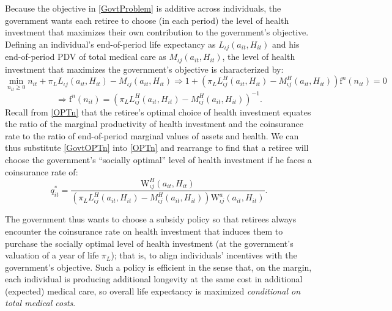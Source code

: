 \documentclass[12pt,pdftex,letterpaper]{article}
\newcommand{\Type}{\iota}
\newcommand{\PostHealth}{H}
\newcommand{\PostValue}{\text{W}}
\newcommand{\Invst}{n}
\newcommand{\Assets}{a}
\newcommand{\Copay}{q}
\newcommand{\Age}{j}
\newcommand{\HealthProdFunc}{\text{f}}
\begin{document}
Because the objective in \eqref{GovtProblem} is additive across individuals, the government wants each retiree to choose (in each period) the level of health investment that maximizes their own contribution to the government's objective.  Defining an individual's end-of-period life expectancy as $L_{\Type \Age}(\Assets_{it},\PostHealth_{it})$ and his end-of-period PDV of total medical care as $M_{\Type \Age}(\Assets_{it},\PostHealth_{it})$, the level of health investment that maximizes the government's objective is characterized by:
\begin{equation*}
\min_{\Invst_{it} \geq 0} \Invst_{it} + \pi_L L_{\Type \Age}(\Assets_{it},\PostHealth_{it}) - M_{\Type \Age}(\Assets_{it},\PostHealth_{it}) \Longrightarrow 1 + \left( \pi_L L^\PostHealth_{\Type \Age}(\Assets_{it},\PostHealth_{it}) - M^\PostHealth_{\Type \Age}(\Assets_{it},\PostHealth_{it}) \right) \HealthProdFunc^\Invst(\Invst_{it}) = 0
\end{equation*}
\begin{equation}\label{GovtOPTn}
\Longrightarrow \HealthProdFunc^\Invst(\Invst_{it}) = \left( \pi_L L^\PostHealth_{\Type \Age}(\Assets_{it},\PostHealth_{it}) - M^\PostHealth_{\Type \Age}(\Assets_{it},\PostHealth_{it}) \right)^{-1}.
\end{equation}
Recall from \eqref{OPTn} that the retiree's optimal choice of health investment equates the ratio of the marginal productivity of health investment and the coinsurance rate to the ratio of end-of-period marginal values of assets and health.  We can thus substitute \eqref{GovtOPTn} into \eqref{OPTn} and rearrange to find that a retiree will choose the government's ``socially optimal'' level of health investment if he faces a coinsurance rate of:
\begin{equation}\label{CopaySocOpt}
\Copay_{it}^* = \frac{\PostValue^\PostHealth_{\Type \Age}(\Assets_{it},\PostHealth_{it})}{\left( \pi_L L^\PostHealth_{\Type \Age}(\Assets_{it},\PostHealth_{it}) - M^\PostHealth_{\Type \Age}(\Assets_{it},\PostHealth_{it}) \right) \PostValue^\Assets_{\Type \Age}(\Assets_{it},\PostHealth_{it})}.
\end{equation}

The government thus wants to choose a subsidy policy so that retirees always encounter the coinsurance rate on health investment that induces them to purchase the socially optimal level of health investment (at the government's valuation of a year of life $\pi_L$); that is, to align individuals' incentives with the government's objective.  Such a policy is efficient in the sense that, on the margin, each individual is producing additional longevity at the same cost in additional (expected) medical care, so overall life expectancy is maximized \textit{conditional on total medical costs}.
\end{document}
